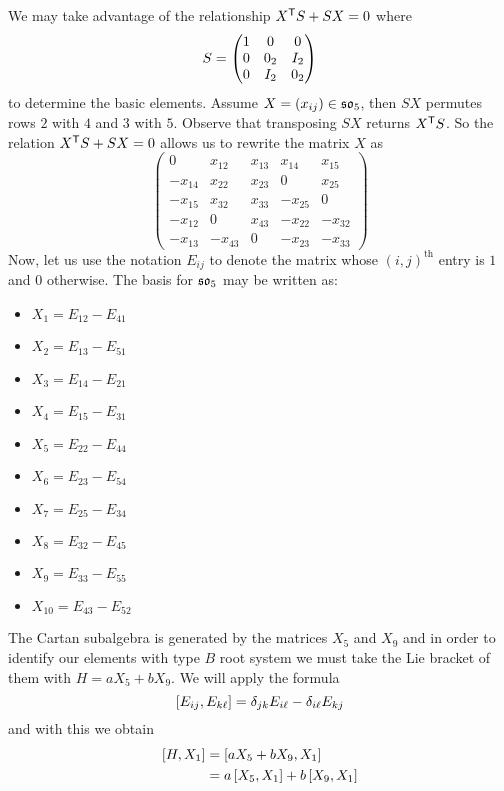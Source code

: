 \documentclass[12pt]{memoir}
\begin{document}
\begin{ptcbr}
    We may take advantage of the relationship $X^{\mathsf{T}} S+SX=0$ where $$S=\begin{pmatrix} 1 & 0 & 0 \\ 0 & 0_2 & I_2 \\ 0 & I_2 & 0_2 \end{pmatrix}$$
    to determine the basic elements. Assume $X=(x_{ij})\in\mathfrak{so}_5$, then $SX$ permutes rows $2$ with $4$ and $3$ with $5$. Observe that transposing $SX$ returns $X^{\mathsf{T}} S$. So the relation 
    $X^{\mathsf{T}}S+SX=0$ allows us to rewrite the matrix $X$ as
    $$
    \begin{pmatrix}
        0&x_{12}&x_{13}&x_{14}&x_{15}\\
        -x_{14}&x_{22}&x_{23}&0&x_{25}\\
        -x_{15}&x_{32}&x_{33}&-x_{25}&0\\
        -x_{12}&0&x_{43}&-x_{22}&-x_{32}\\
        -x_{13}&-x_{43}&0&-x_{23}&-x_{33}
    \end{pmatrix}
    $$
    Now, let us use the notation $E_{ij}$ to denote the matrix whose $(i,j)^{\text{th}}$ entry is $1$ and 0 otherwise. The basis for $\mathfrak{so}_{5}$ may be written as:
    \begin{multicols}{2}
        \begin{itemize}
            \item $X_1=E_{12}-E_{41}$
            \item $X_2=E_{13}-E_{51}$
            \item $X_3=E_{14}-E_{21}$
            \item $X_4=E_{15}-E_{31}$
            \item $X_5=E_{22}-E_{44}$
            \item $X_6=E_{23}-E_{54}$
            \item $X_7=E_{25}-E_{34}$
            \item $X_8=E_{32}-E_{45}$
            \item $X_9=E_{33}-E_{55}$
            \item $X_{10}=E_{43}-E_{52}$
        \end{itemize}
    \end{multicols}
    The Cartan subalgebra is generated by the matrices $X_5$ and $X_9$ and in order to identify our elements with type $B$ root system we must take the Lie bracket of them with $H=aX_5+bX_9$. We will apply the formula 
    $$\left\lbrack E_{ij},E_{k\ell}\right\rbrack=\delta_{jk}E_{i\ell}-\delta_{i\ell}E_{kj}$$
    and with this we obtain
    \begin{align*}
        \bonj{H,X_1}&=\bonj{aX_5+bX_9,X_1}\\
        &=a\bonj{X_5,X_1}+b\bonj{X_9,X_1}\\

\end{align*}
\end{ptcbr}
\end{document}
